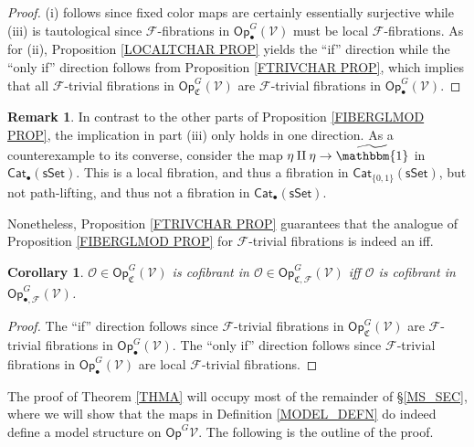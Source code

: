 \documentclass[a4paper,10pt
,draft
]{article}%
\numberwithin{equation}{section}
\numberwithin{figure}{section}
\newtheorem{corollary}[equation]{Corollary}%
\theoremstyle{definition} %
\newtheorem{remark}[equation]{Remark}%
\newcommand{\Op}{\mathsf{Op}}%
\newcommand{\F}{\ensuremath{\mathcal F}}
\newcommand{\V}{\ensuremath{\mathcal V}}
\renewcommand{\O}{\ensuremath{\mathcal O}}
\newcommand{\1}{\ensuremath{\mathbbm 1}}%
\begin{document}
\begin{proof}
	(i) follows since fixed color maps are certainly essentially surjective while (iii) is tautological since 
	$\F$-fibrations in $\mathsf{Op}_{\bullet}^G(\V)$ must be local $\F$-fibrations.
	As for (ii), 
	Proposition \ref{LOCALTCHAR PROP} yields the ``if'' direction
	while the ``only if'' direction follows from 
	Proposition \ref{FTRIVCHAR PROP}, 
	which implies that all $\F$-trivial fibrations in $\mathsf{Op}_{\mathfrak{C}}^G(\V)$
	are $\F$-trivial fibrations in 
	$\mathsf{Op}_{\bullet}^G(\V)$.
\end{proof}


\begin{remark}
In contrast to the other parts of 
Proposition \ref{FIBERGLMOD PROP},
the implication in part (iii) 
only holds in one direction. 
As a counterexample to its converse, 
consider the map $\eta \amalg \eta \to \widetilde{\mathbbm{1}}$
in $\mathsf{Cat}_{\bullet}(\mathsf{sSet})$. This is a local fibration, 
and thus a fibration in $\mathsf{Cat}_{\{0,1\}}(\mathsf{sSet})$,
but not path-lifting, and thus not a fibration in $\mathsf{Cat}_{\bullet}(\mathsf{sSet})$.

Nonetheless, Proposition \ref{FTRIVCHAR PROP}
guarantees that the analogue of Proposition \ref{FIBERGLMOD PROP}
for $\F$-trivial fibrations is indeed an iff.
\end{remark}



\begin{corollary}
      $\O \in \Op^G_{\mathfrak C}(\V)$ is cofibrant in
      $\O \in \Op^G_{\mathfrak C,\mathcal{F}}(\V)$
      iff $\O$ is cofibrant in $\Op^G_{\bullet,\F}(\V)$.
\end{corollary}

\begin{proof}
	The ``if'' direction follows since
	$\F$-trivial fibrations in $ \Op^G_{\mathfrak C}(\V)$
	are
	$\F$-trivial fibrations in $ \Op^G_{\bullet}(\V)$.
	The ``only if'' direction follows since
	$\F$-trivial fibrations in $ \Op^G_{\bullet}(\V)$
	are local $\F$-trivial fibrations.
\end{proof}


The proof of Theorem \ref{THMA} will occupy most of 
the remainder of \S \ref{MS_SEC},
where we will show that the maps in Definition \ref{MODEL_DEFN}
do indeed define a model structure on $\mathsf{Op}^G{\V}$.
The following is the outline of the proof.
\end{document}
